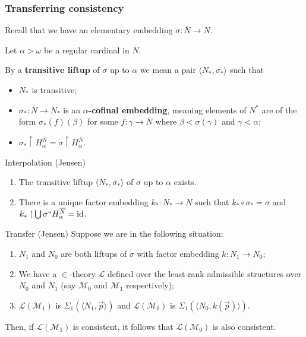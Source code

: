 \documentclass[utf8x,xcolor=svgnames,8pt]{beamer}
\newcommand{\M}{\mathcal{M}}
\newcommand{\N}{{\overline{N}}}
\newcommand{\id}{\textup{\ensuremath{\text{id}}}}
\newcommand{\To}{\longrightarrow}
\newcommand{\rest}{\mathbin{\upharpoonright}}
\begin{document}
\begin{frame} \frametitle{Transferring consistency}

Recall that we have an elementary embedding $\sigma:\N \To N$. 

Let $\alpha > \omega$ be a regular cardinal in $\N$. 

\vspace{1em}

By a \textbf{transitive liftup} of $\sigma$ up to $\alpha$ we mean a pair $\langle N_* , \sigma_* \rangle$ such that 
\begin{itemize} 
	\item $N_*$ is transitive;
	\item $\sigma_*:\N \To N_*$ is an \textbf{$\alpha$-cofinal embedding}, meaning elements of $N^*$ are of the form $\sigma_*(f)(\beta)$ for some $f: \gamma \To \N$ where $\beta < \sigma(\gamma)$ and $\gamma<\alpha$;
	\item $\sigma_* \upharpoonright H_{\alpha}^{\N}= \sigma \upharpoonright H_{\alpha}^{\N}$. 
\end{itemize}

\begin{block}{Interpolation (Jensen)}
\begin{enumerate}
	\item The transitive liftup $\langle N_*, \sigma_* \rangle$ of $\sigma$ up to $\alpha$ exists.
	\item There is a unique factor embedding $k_*:N_*  \To N$ such that $k_* \circ \sigma_* = \sigma$ and $k_* \rest \bigcup \sigma `` H^{\N}_\alpha = \id$.
\end{enumerate}
\end{block} 

\begin{block}{Transfer (Jensen)}
Suppose we are in the following situation:
\begin{enumerate}
	\item $N_1$ and $N_0$ are both liftups of $\sigma$ with factor embedding $k: N_1 \To N_0$;
	\item We have a $\in$-theory $\mathcal L$ defined over the least-rank admissible structures over $N_0$ and $N_1$ (say $\mathcal M_0$ and $\mathcal M_1$ respectively);
	\item $\mathcal L(\M_1)$ is $\Sigma_1(\langle N_1, \vec{p}\rangle)$ and $\mathcal L(\M_0)$ is $\Sigma_1(\langle N_0, k(\vec p) \rangle)$.
\end{enumerate}
Then, 
if $\mathcal L(\mathcal M_1)$ is consistent, it follows that $\mathcal L(\mathcal M_0)$ is also consistent. 
\end{block} 

\end{frame}
\end{document}
